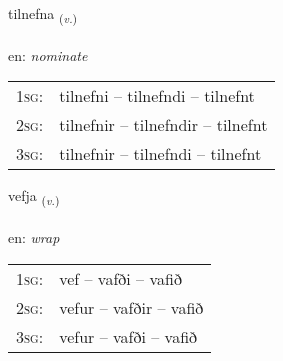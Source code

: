 \documentclass[frontgrid, backgrid]{flacards}\usepackage[]{graphicx}\usepackage[]{xcolor}
\begin{document}
\renewcommand{\flhead}{\vskip5pt \fboxsep=0pt {\small\bfseries\footnotesize Sagnorð | Verb}}
\renewcommand{\fcfoot}{\vskip5pt \fboxsep=0pt \hspace{2pt}{\small\bfseries\footnotesize 3K}}

\renewcommand{\blhead}{\vskip5pt {\small\bfseries\footnotesize Sagnorð | Verb }}
\renewcommand{\bcfoot}{\vskip5pt \hspace{2pt}{\small\bfseries\footnotesize 3K}}


{tilnefna \small{\textsubscript{(\textit{v.})}} \\[1ex] %
\textphonetic{[tʰɪlnɛpna]} \\
en: \emph{nominate} \\  [2ex]
\renewcommand*{\arraystretch}{0.8}
\begin{tabular}{p{1cm}l}
\textsc{1sg}: & tilnefni -- tilnefndi -- tilnefnt \\ 
\textsc{2sg}: & tilnefnir -- tilnefndir -- tilnefnt \\ 
\textsc{3sg}: & tilnefnir -- tilnefndi -- tilnefnt \\ 
\end{tabular}
}

\renewcommand{\flhead}{\vskip5pt \fboxsep=0pt {\small\bfseries\footnotesize Sagnorð | Verb}}
\renewcommand{\fcfoot}{\vskip5pt \fboxsep=0pt \hspace{2pt}{\small\bfseries\footnotesize 3K}}

\renewcommand{\blhead}{\vskip5pt {\small\bfseries\footnotesize Sagnorð | Verb }}
\renewcommand{\bcfoot}{\vskip5pt \hspace{2pt}{\small\bfseries\footnotesize 3K}}


{vefja \small{\textsubscript{(\textit{v.})}} \\[1ex] %
\textphonetic{[vɛvja]} \\
en: \emph{wrap} \\  [2ex]
\renewcommand*{\arraystretch}{0.8}
\begin{tabular}{p{1cm}l}
\textsc{1sg}: & vef -- vafði -- vafið \\ 
\textsc{2sg}: & vefur -- vafðir -- vafið \\ 
\textsc{3sg}: & vefur -- vafði -- vafið \\ 
\end{tabular}
}
\end{document}
